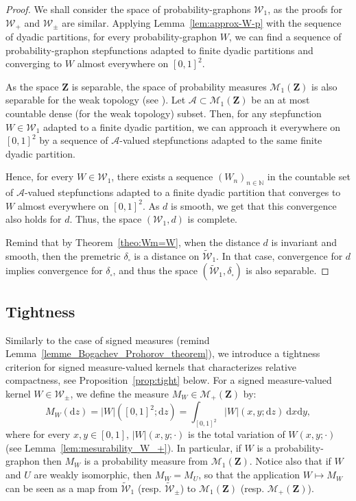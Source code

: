 \documentclass{amsart}
\theoremstyle{plain}
\theoremstyle{definition}
\newcommand{\Space}{\mathbf{Z}}
\newcommand{\signed}{\pm}
\newcommand{\ca}{\mathcal{A}}
\newcommand{\Proba}{\mathcal{M}_1(\Space)}
\newcommand{\Meas}{\mathcal{M}_+(\Space)}
\newcommand{\Graphon}{\mathcal{W}_1}
\newcommand{\Kernel}{\mathcal{W}_{\signed}}
\newcommand{\Kernelp}{\mathcal{W}_{+}}
\newcommand{\UGraphon}{\widetilde{\mathcal{W}}_1}
\newcommand{\UKernel}{\widetilde{\mathcal{W}}_{\signed}}
\newcommand{\dd}{\delta_{\square}}
\newcommand{\N}{\mathbb{N}}
\newcommand{\drv}{\mathrm{d}}
\begin{document}
\begin{proof}
We shall consider the space of probability-graphons $\Graphon$, as the proofs for
$\Kernelp$ and $\Kernel$ are similar. 
Applying Lemma~\ref{lem:approx-W-p} with the sequence of dyadic partitions,
for every probability-graphon $W$, we can find a sequence of probability-graphon stepfunctions
adapted to finite dyadic partitions and
converging to $W$ almost everywhere on $[0,1]^2$.

As the space $\Space$ is separable, 
the space of probability measures $\Proba$ is also separable
for the weak topology (see \cite[Theorem~6.8]{Billingsley}).
Let $\ca\subset \Proba$ be an at most countable dense (for the weak
topology) subset. Then, for any stepfunction $W\in \Graphon$ adapted 
to a finite dyadic partition, we can approach it everywhere on $[0,1]^2$
by a sequence of  $\ca$-valued stepfunctions adapted 
to the same finite dyadic partition.  

Hence,   for   every   $W\in   \Graphon$,   there   exists   a   sequence
$(W_n )_{n\in\N}$  in the countable  set of  $\ca$-valued stepfunctions
adapted to a finite dyadic partition 
that converges to $W$ almost everywhere on $[0,1]^2$.
As $d$ is smooth, we get that this convergence also holds for $d$.
Thus, the space $(\Graphon, d)$ is complete.

Remind that by Theorem~\ref{theo:Wm=W},
	when the distance $d$ is invariant and smooth,
	then the premetric $\dd$ is a distance on $\UGraphon$.
In that case, convergence for $d$ implies convergence for $\dd$,
and thus the space $(\UGraphon,  \dd)$ is also separable.
\end{proof}


\subsection{Tightness}

Similarly to  the case of  signed measures (remind Lemma~\ref{lemme_Bogachev_Prohorov_theorem}), 
we introduce a  tightness criterion
for signed measure-valued kernels that characterizes relative
compactness, see  Proposition~\ref{prop:tight} below. 
For a signed measure-valued kernel $W\in \Kernel$,
we define the measure $M_W \in \Meas$ by:
\begin{equation}
  \label{eq:def-MW}
M_W(\drv z) 
= \vert W \vert ([0,1]^2; \drv z)
= \int_{[0,1]^2} \vert W\vert (x,y;\drv z) \ \drv x \drv y,
\end{equation}
where for every $x,y\in[0,1]$, $\vert W\vert (x,y;\cdot)$
	is the total variation of $W(x,y;\cdot)$
	(see Lemma~\ref{lem:mesurability_W_+}).
In particular, if $W$ is a probability-graphon
then $M_W$ is a probability measure from $\Proba$. Notice also that if
$W$ and $U$ are weakly isomorphic, then $M_W=M_U$, so that the
application $W \mapsto M_W$ can be seen as a map from $\UGraphon$
(resp. 
$\UKernel$) to $\Proba$ (resp. $\Meas$). 
\end{document}
